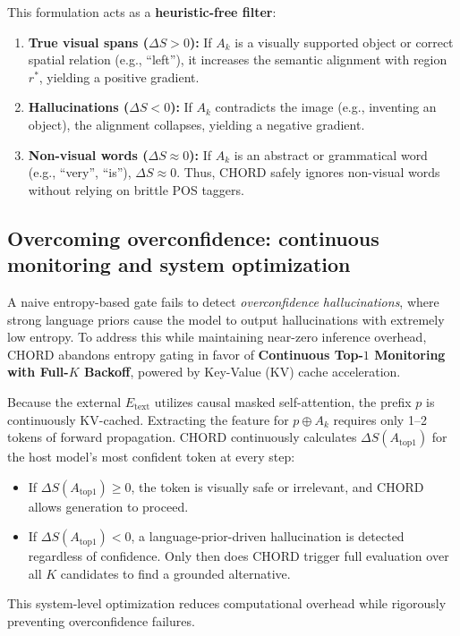 This formulation acts as a \textbf{heuristic-free filter}:
\begin{enumerate}
  \item \textbf{True visual spans ($\Delta S > 0$):} If $A_k$ is a visually supported object or correct spatial relation (e.g., ``left''), it increases the semantic alignment with region $r^*$, yielding a positive gradient.
  \item \textbf{Hallucinations ($\Delta S < 0$):} If $A_k$ contradicts the image (e.g., inventing an object), the alignment collapses, yielding a negative gradient.
  \item \textbf{Non-visual words ($\Delta S \approx 0$):} If $A_k$ is an abstract or grammatical word (e.g., ``very'', ``is''), $\Delta S \approx 0$. Thus, CHORD safely ignores non-visual words without relying on brittle POS taggers.
\end{enumerate}

\subsection{Overcoming overconfidence: continuous monitoring and system optimization}

A naive entropy-based gate fails to detect \emph{overconfidence hallucinations}, where strong language priors cause the model to output hallucinations with extremely low entropy. To address this while maintaining near-zero inference overhead, CHORD abandons entropy gating in favor of \textbf{Continuous Top-$1$ Monitoring with Full-$K$ Backoff}, powered by Key-Value (KV) cache acceleration.

Because the external $E_{\text{text}}$ utilizes causal masked self-attention, the prefix $p$ is continuously KV-cached. Extracting the feature for $p \oplus A_k$ requires only 1--2 tokens of forward propagation. CHORD continuously calculates $\Delta S(A_{\text{top1}})$ for the host model's most confident token at every step:
\begin{itemize}
  \item If $\Delta S(A_{\text{top1}}) \ge 0$, the token is visually safe or irrelevant, and CHORD allows generation to proceed.
  \item If $\Delta S(A_{\text{top1}}) < 0$, a language-prior-driven hallucination is detected regardless of confidence. Only then does CHORD trigger full evaluation over all $K$ candidates to find a grounded alternative.
\end{itemize}
This system-level optimization reduces computational overhead while rigorously preventing overconfidence failures.

